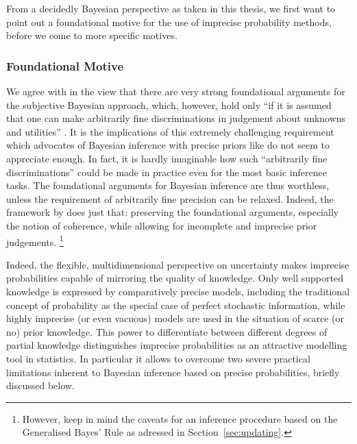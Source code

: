 From a decidedly Bayesian perspective as taken in this thesis,
we first want to point out a foundational motive for the use of imprecise probability methods,
before we come to more specific motives.

\subsubsection{Foundational Motive}
\label{sec:motivation:bayesian-foundational}

We agree with \textcite[\S 1.1]{1994:berger} in the view that there are very strong foundational arguments
for the subjective Bayesian approach, which, however, hold only
``if it is assumed that one can make arbitrarily fine discriminations
in judgement about unknowns and utilities'' \parencite[p.~303]{1994:berger}. 
It is the implications of this extremely challenging requirement
which advocates of Bayesian inference with precise priors
like \textcite{1987:lindley} do not seem to appreciate enough.
In fact, it is hardly imaginable how such ``arbitrarily fine discriminations''
could be made in practice even for the most basic inference tasks.
The foundational arguments for Bayesian inference are thus worthless,
unless the requirement of arbitrarily fine precision can be relaxed.
Indeed, the framework by \textcite{1991:walley} does just that:
preserving the foundational arguments, especially the notion of coherence,
while allowing for incomplete and imprecise prior judgements.%
\footnote{However, keep in mind the caveats for an inference procedure based on the Generalised Bayes' Rule
as adressed in Section~\ref{sec:updating}.}

Indeed,
the flexible, multidimensional perspective on uncertainty makes imprecise probabilities capable of mirroring the quality of knowledge.
Only well supported knowledge is expressed by comparatively precise models,
including the traditional concept of probability as the special case of perfect stochastic information,
while highly imprecise (or even vacuous) models are used in the situation of scarce (or no) prior knowledge.
This power to differentiate between different degrees of partial knowledge
distinguishes imprecise probabilities as an attractive modelling tool in statistics.
In particular it allows to overcome two severe practical limitations inherent to Bayesian inference based on precise probabilities,
briefly discussed below.

